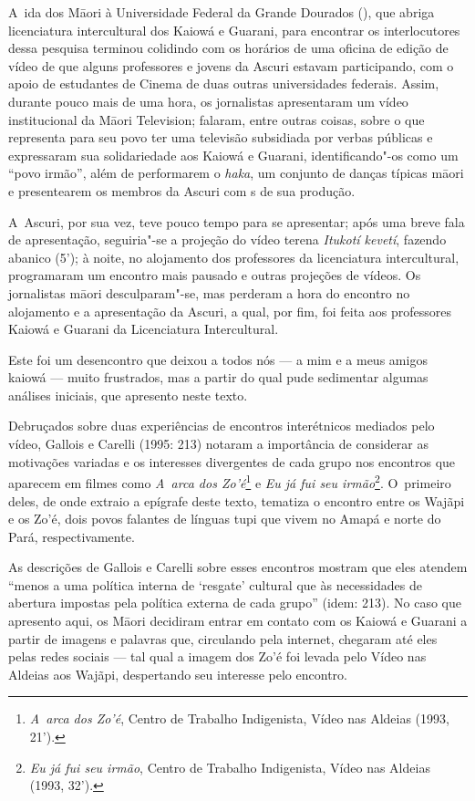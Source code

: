 A~ida dos M\=aori à Universidade Federal da Grande Dourados (), que
abriga licenciatura intercultural dos Kaiowá e Guarani, para encontrar
os interlocutores dessa pesquisa terminou colidindo com os horários de
uma oficina de edição de vídeo de que alguns professores e jovens da
Ascuri estavam participando, com o apoio de estudantes de Cinema de
duas outras universidades federais. Assim, durante pouco mais de uma
hora, os jornalistas apresentaram um vídeo institucional da M\=aori
Television; falaram, entre outras coisas, sobre o que representa para
seu povo ter uma televisão subsidiada por verbas públicas e expressaram
sua solidariedade aos Kaiowá e Guarani, identificando"-os como um ``povo
irmão'', além de performarem o \emph{haka}, um conjunto de danças típicas
m\=aori e presentearem os membros da Ascuri com s de sua produção. 

A~Ascuri, por sua vez, teve pouco tempo para se apresentar; após uma
breve fala de apresentação, seguiria"-se a projeção do vídeo terena
\emph{Itukotí kevetí}, fazendo abanico (5’); à noite, no alojamento dos
professores da licenciatura intercultural, programaram um encontro mais
pausado e outras projeções de vídeos. Os jornalistas m\=aori
desculparam"-se, mas perderam a hora do encontro no alojamento e a
apresentação da Ascuri, a qual, por fim, foi feita aos professores
Kaiowá e Guarani da Licenciatura Intercultural. 

Este foi um desencontro que deixou a todos nós --- a mim e a meus amigos
kaiowá --- muito frustrados, mas a partir do qual pude sedimentar algumas
análises iniciais, que apresento neste texto. 

Debruçados sobre duas experiências de encontros interétnicos mediados
pelo vídeo, Gallois e Carelli (1995: 213) notaram a importância de
considerar as motivações variadas e os interesses divergentes de cada
grupo nos encontros que aparecem em filmes como \emph{A~arca dos
Zo’é}\footnote{\emph{A~arca dos Zo’é}, Centro de Trabalho Indigenista, Vídeo
nas Aldeias (1993, 21’).} e \emph{Eu já fui seu irmão}\footnote{\emph{Eu já fui seu
irmão}, Centro de Trabalho Indigenista, Vídeo nas Aldeias (1993, 32’).}.
O~primeiro deles, de onde extraio a epígrafe deste texto, tematiza o
encontro entre os Wajãpi e os Zo’é, dois povos falantes de línguas tupi
que vivem no Amapá e norte do Pará, respectivamente.

As descrições de Gallois e Carelli sobre esses encontros mostram que
eles atendem ``menos a uma política interna de `resgate' cultural que às
necessidades de abertura impostas pela política externa de cada grupo''
(idem: 213). No caso que apresento aqui, os M\=aori decidiram entrar em
contato com os Kaiowá e Guarani a partir de imagens e palavras que,
circulando pela internet, chegaram até eles pelas redes sociais --- tal
qual a imagem dos Zo’é foi levada pelo Vídeo nas Aldeias aos Wajãpi,
despertando seu interesse pelo encontro.


